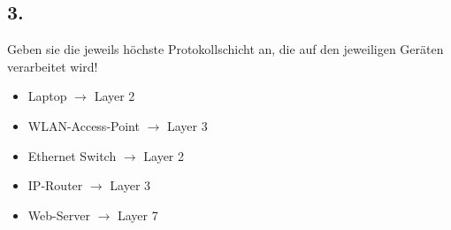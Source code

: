 \documentclass[paper=a4, fontsize=11pt]{scrartcl}
\numberwithin{equation}{section}
\numberwithin{figure}{section}
\numberwithin{table}{section}
\begin{document}
\subsection{3.}
Geben sie die jeweils höchste Protokollschicht an, die auf den jeweiligen Geräten verarbeitet wird! \\

\begin{itemize}
\item Laptop $\rightarrow$ Layer 2
\item WLAN-Access-Point $\rightarrow$ Layer 3
\item Ethernet Switch $\rightarrow$ Layer 2
\item IP-Router $\rightarrow$ Layer 3
\item Web-Server $\rightarrow$ Layer 7
\end{itemize}

\end{document}
